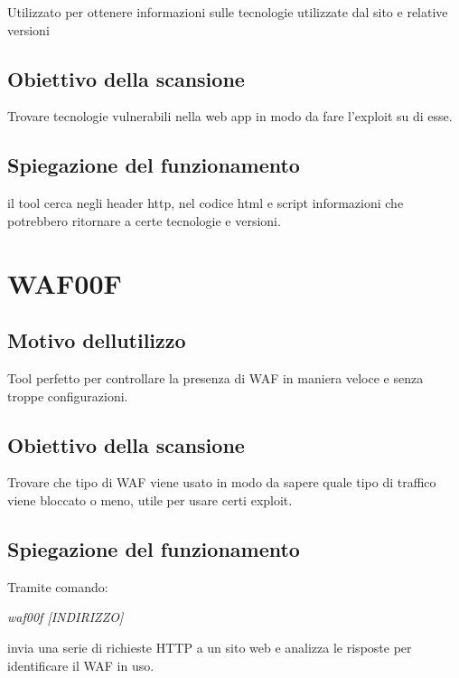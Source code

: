 Utilizzato per ottenere informazioni sulle tecnologie utilizzate dal
sito e relative versioni

\subsection{Obiettivo della
scansione}\label{obiettivo-della-scansione-2}

Trovare tecnologie vulnerabili nella web app in modo da fare l'exploit
su di esse.

\subsection{Spiegazione del
funzionamento}\label{spiegazione-del-funzionamento-2}

il tool cerca negli header http, nel codice html e script informazioni
che potrebbero ritornare a certe tecnologie e versioni.

\section{WAF00F}\label{waf00f}

\subsection{Motivo
dell\textquotesingle utilizzo}\label{motivo-dellutilizzo-3}

Tool perfetto per controllare la presenza di WAF in maniera veloce e
senza troppe configurazioni.

\subsection{Obiettivo della
scansione}\label{obiettivo-della-scansione-3}

Trovare che tipo di WAF viene usato in modo da sapere quale tipo di
traffico viene bloccato o meno, utile per usare certi exploit.

\subsection{Spiegazione del
funzionamento}\label{spiegazione-del-funzionamento-3}

Tramite comando:

\emph{waf00f {[}INDIRIZZO{]}}

invia una serie di richieste HTTP a un sito web e analizza le risposte
per identificare il WAF in uso.

